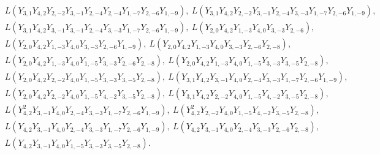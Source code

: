 \documentclass[12pt, reqno]{amsart}
\theoremstyle{plain}
\theoremstyle{definition}
\numberwithin{equation}{section}
\begin{document}
\begin{align*}
& 
L(Y_{3, 1}Y_{4, 2}Y_{2, -2}Y_{3, -1}Y_{2, -4}Y_{2, -4}Y_{1, -7}Y_{2, -6}Y_{1, -9}), \
L(Y_{3, 1}Y_{4, 2}Y_{2, -2}Y_{3, -1}Y_{2, -4}Y_{3, -3}Y_{1, -7}Y_{2, -6}Y_{1, -9}), \\
& 
L(Y_{3, 1}Y_{4, 2}Y_{3, -1}Y_{3, -1}Y_{2, -4}Y_{3, -3}Y_{1, -7}Y_{2, -6}Y_{1, -9}), \
L(Y_{2, 0}Y_{4, 2}Y_{1, -3}Y_{4, 0}Y_{3, -3}Y_{2, -6}), 
\end{align*}
\begin{align*}
& 
L(Y_{2, 0}Y_{4, 2}Y_{1, -3}Y_{4, 0}Y_{3, -3}Y_{2, -6}Y_{1, -9}), \
L(Y_{2, 0}Y_{4, 2}Y_{1, -3}Y_{4, 0}Y_{3, -3}Y_{2, -6}Y_{2, -8}), \\ 
& 
L(Y_{2, 0}Y_{4, 2}Y_{1, -3}Y_{4, 0}Y_{1, -5}Y_{3, -3}Y_{2, -6}Y_{2, -8}), \
L(Y_{2, 0}Y_{4, 2}Y_{1, -3}Y_{4, 0}Y_{1, -5}Y_{3, -3}Y_{3, -5}Y_{2, -8}), 
\end{align*}
\begin{align*}
& 
L(Y_{2, 0}Y_{4, 2}Y_{2, -2}Y_{4, 0}Y_{1, -5}Y_{3, -3}Y_{3, -5}Y_{2, -8}), \
L(Y_{3, 1}Y_{4, 2}Y_{3, -1}Y_{4, 0}Y_{2, -4}Y_{3, -3}Y_{1, -7}Y_{2, -6}Y_{1, -9}), \\ 
& 
L(Y_{2, 0}Y_{4, 2}Y_{2, -2}Y_{4, 0}Y_{1, -5}Y_{4, -2}Y_{3, -5}Y_{2, -8}), \
L(Y_{3, 1}Y_{4, 2}Y_{2, -2}Y_{4, 0}Y_{1, -5}Y_{4, -2}Y_{3, -5}Y_{2, -8}), 
\end{align*}
\begin{align*}
& 
L(Y_{4, 2}^2 Y_{3, -1}Y_{4, 0}Y_{2, -4}Y_{3, -3}Y_{1, -7}Y_{2, -6}Y_{1, -9}), \
L(Y_{4, 2}^2 Y_{2, -2}Y_{4, 0}Y_{1, -5}Y_{4, -2}Y_{3, -5}Y_{2, -8}), \\ 
&
L(Y_{4, 2}Y_{3, -1}Y_{4, 0}Y_{2, -4}Y_{3, -3}Y_{1, -7}Y_{2, -6}Y_{1, -9}), \
L(Y_{4, 2}Y_{3, -1}Y_{4, 0}Y_{2, -4}Y_{3, -3}Y_{2, -6}Y_{2, -8}), \\
&
L(Y_{4, 2}Y_{3, -1}Y_{4, 0}Y_{1, -5}Y_{3, -3}Y_{3, -5}Y_{2, -8}).
\end{align*}
\end{document}
